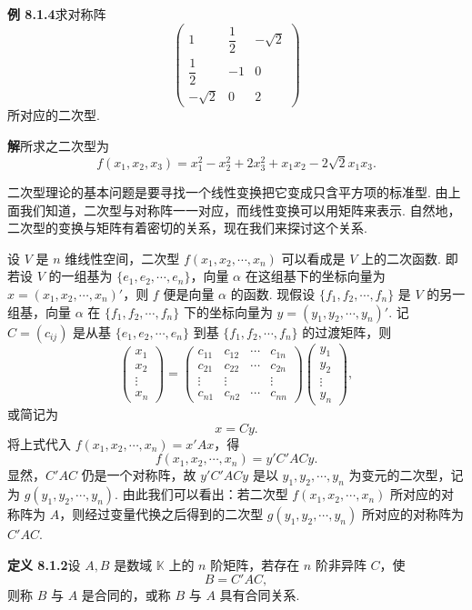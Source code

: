 \documentclass[UTF8, 12pt, fontset=fandol, oneside]{ctexart}
\begin{document}
\noindent\textbf{例 8.1.4}\quad 求对称阵
\[
\left(\begin{array}{ccc}
1&\dfrac12&-\sqrt2\\
\dfrac12&-1&0\\
-\sqrt2&0&2
\end{array}\right)
\]
所对应的二次型.

\noindent\textbf{解}\quad 所求之二次型为
\[
f(x_1,x_2,x_3)=x_1^2-x_2^2+2x_3^2+x_1x_2-2\sqrt2x_1x_3.
\]

二次型理论的基本问题是要寻找一个线性变换把它变成只含平方项的标准型. 由上面我们知道，二次型与对称阵一一对应，而线性变换可以用矩阵来表示. 自然地，二次型的变换与矩阵有着密切的关系，现在我们来探讨这个关系.

设 $V$ 是 $n$ 维线性空间，二次型 $f(x_1,x_2,\cdots,x_n)$ 可以看成是 $V$ 上的二次函数. 即若设 $V$ 的一组基为 $\{e_1,e_2,\cdots,e_n\}$，向量 $\alpha$ 在这组基下的坐标向量为 $x=(x_1,x_2,\cdots,x_n)'$，则 $f$ 便是向量 $\alpha$ 的函数. 现假设 $\{f_1,f_2,\cdots,f_n\}$ 是 $V$ 的另一组基，向量 $\alpha$ 在 $\{f_1,f_2,\cdots,f_n\}$ 下的坐标向量为 $y=(y_1,y_2,\cdots,y_n)'$. 记 $C=(c_{ij})$ 是从基 $\{e_1,e_2,\cdots,e_n\}$ 到基 $\{f_1,f_2,\cdots,f_n\}$ 的过渡矩阵，则
\[
\left(\begin{array}{c}
x_1\\
x_2\\
\vdots\\
x_n
\end{array}\right)
=
\left(\begin{array}{cccc}
c_{11}&c_{12}&\cdots&c_{1n}\\
c_{21}&c_{22}&\cdots&c_{2n}\\
\vdots&\vdots&&\vdots\\
c_{n1}&c_{n2}&\cdots&c_{nn}
\end{array}\right)
\left(\begin{array}{c}
y_1\\
y_2\\
\vdots\\
y_n
\end{array}\right),
\]
或简记为
\[
x=Cy.
\]
将上式代入 $f(x_1,x_2,\cdots,x_n)=x'Ax$，得
\[
f(x_1,x_2,\cdots,x_n)=y'C'ACy.
\]
显然，$C'AC$ 仍是一个对称阵，故 $y'C'ACy$ 是以 $y_1,y_2,\cdots,y_n$ 为变元的二次型，记为 $g(y_1,y_2,\cdots,y_n)$. 由此我们可以看出：若二次型 $f(x_1,x_2,\cdots,x_n)$ 所对应的对称阵为 $A$，则经过变量代换之后得到的二次型 $g(y_1,y_2,\cdots,y_n)$ 所对应的对称阵为 $C'AC$.

\noindent\textbf{定义 8.1.2}\quad 设 $A,B$ 是数域 $\mathbb K$ 上的 $n$ 阶矩阵，若存在 $n$ 阶非异阵 $C$，使
\[
B=C'AC,
\]
则称 $B$ 与 $A$ 是合同的，或称 $B$ 与 $A$ 具有合同关系.
\end{document}
